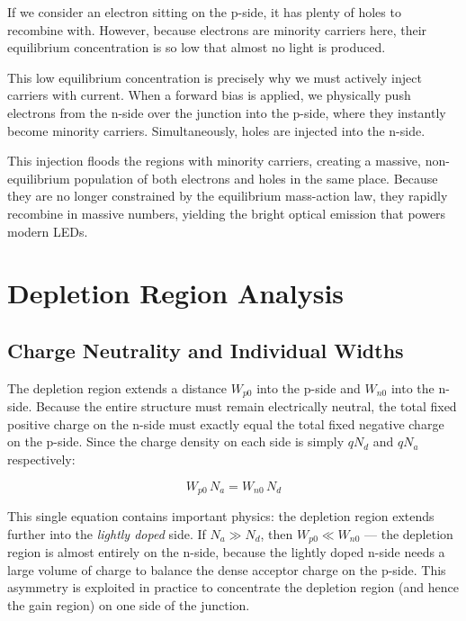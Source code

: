 If we consider an electron sitting on the p-side, it has plenty of holes to recombine with. However, because electrons are minority carriers here, their equilibrium concentration is so low that almost no light is produced.

This low equilibrium concentration is precisely why we must actively inject carriers with current. When a forward bias is applied, we physically push electrons from the n-side over the junction into the p-side, where they instantly become minority carriers. Simultaneously, holes are injected into the n-side.

This injection floods the regions with minority carriers, creating a massive, non-equilibrium population of both electrons and holes in the same place. Because they are no longer constrained by the equilibrium mass-action law, they rapidly recombine in massive numbers, yielding the bright optical emission that powers modern LEDs.

\section{Depletion Region Analysis}

\subsection{Charge Neutrality and Individual Widths}

The depletion region extends a distance $W_{p0}$ into the p-side and $W_{n0}$ into the n-side. Because the entire structure must remain electrically neutral, the total fixed positive charge on the n-side must exactly equal the total fixed negative charge on the p-side. Since the charge density on each side is simply $qN_d$ and $qN_a$ respectively:
\begin{keyresult}
    \begin{equation}
        W_{p0}\,N_a = W_{n0}\,N_d
    \end{equation}
\end{keyresult}

This single equation contains important physics: the depletion region extends further into the \emph{lightly doped} side. If $N_a \gg N_d$, then $W_{p0} \ll W_{n0}$ — the depletion region is almost entirely on the n-side, because the lightly doped n-side needs a large volume of charge to balance the dense acceptor charge on the p-side. This asymmetry is exploited in practice to concentrate the depletion region (and hence the gain region) on one side of the junction.

